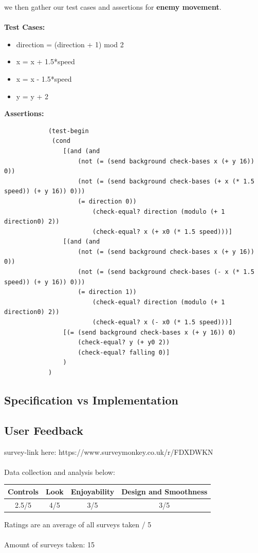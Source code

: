 \documentclass{article}
\begin{document}
\begin{itemize}
			we then gather our test cases and assertions for \textbf{enemy movement}. \\ \\
			\textbf{Test Cases:}
			\begin{itemize}
				\item \quad direction = (direction + 1) mod 2
				\item \quad x = x + 1.5*speed
				\item \quad x = x - 1.5*speed
				\item \quad y = y + 2
			\end{itemize}
			\textbf{Assertions:}
			\begin{lstlisting}
			(test-begin
			 (cond
				[(and (and
					(not (= (send background check-bases x (+ y 16)) 0))
					(not (= (send background check-bases (+ x (* 1.5 speed)) (+ y 16)) 0)))
					(= direction 0))
						(check-equal? direction (modulo (+ 1 direction0) 2))
						(check-equal? x (+ x0 (* 1.5 speed)))]
				[(and (and
					(not (= (send background check-bases x (+ y 16)) 0))
					(not (= (send background check-bases (- x (* 1.5 speed)) (+ y 16)) 0)))
					(= direction 1))
						(check-equal? direction (modulo (+ 1 direction0) 2))
						(check-equal? x (- x0 (* 1.5 speed)))]
				[(= (send background check-bases x (+ y 16)) 0)
					(check-equal? y (+ y0 2))
					(check-equal? falling 0)]
				)
			)
			\end{lstlisting}
	\subsection{Specification vs Implementation}
	\end{itemize}
	\subsection{User Feedback}
	survey-link here: https://www.surveymonkey.co.uk/r/FDXDWKN \\ \\
	Data collection and analysis below: \\
	\begin{center}
		\begin{tabular}{ |c|c|c|c| } 
			\hline
			Controls & Look & Enjoyability & Design and Smoothness  \\ 
			\hline
			2.5/5 & 4/5 & 3/5 & 3/5\\ 
			\hline
		\end{tabular}
	\end{center}
	Ratings are an average of all surveys taken / 5 \\ \\
	Amount of surveys taken: 15
	
\end{document}

